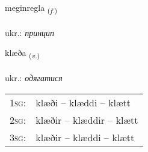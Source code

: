 \documentclass[frontgrid, backgrid]{flacards}\usepackage[]{graphicx}\usepackage[]{xcolor}
\begin{document}
\renewcommand{\flhead}{\vskip5pt \fboxsep=0pt {\small\bfseries\footnotesize Nafnorð | іменник}}
\renewcommand{\fcfoot}{\vskip5pt \fboxsep=0pt \hspace{2pt}{\small\bfseries\footnotesize 2K}}

\renewcommand{\blhead}{\vskip5pt {\small\bfseries\footnotesize Nafnorð | іменник }}
\renewcommand{\bcfoot}{\vskip5pt \hspace{2pt}{\small\bfseries\footnotesize 2K}}


{meginregla \small{\textsubscript{(\textit{f.})}} \\[1ex] %
\textphonetic{[meijɪnrɛkla]} \\
ukr.: \emph{принцип} \\  [2ex]
\renewcommand*{\arraystretch}{0.8}
}

\renewcommand{\flhead}{\vskip5pt \fboxsep=0pt {\small\bfseries\footnotesize Sagnorð | дієслово}}
\renewcommand{\fcfoot}{\vskip5pt \fboxsep=0pt \hspace{2pt}{\small\bfseries\footnotesize 2K}}

\renewcommand{\blhead}{\vskip5pt {\small\bfseries\footnotesize Sagnorð | дієслово }}
\renewcommand{\bcfoot}{\vskip5pt \hspace{2pt}{\small\bfseries\footnotesize 2K}}


{klæða \small{\textsubscript{(\textit{v.})}} \\[1ex] %
\textphonetic{[kʰlaiːða]} \\
ukr.: \emph{одягатися} \\  [2ex]
\renewcommand*{\arraystretch}{0.8}
\begin{tabular}{p{1cm}l}
\textsc{1sg}: & klæði -- klæddi -- klætt \\ 
\textsc{2sg}: & klæðir -- klæddir -- klætt \\ 
\textsc{3sg}: & klæðir -- klæddi -- klætt \\ 
\end{tabular}
}
\end{document}

